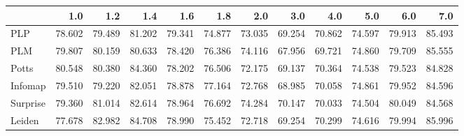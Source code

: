 \begin{tabular}{lrrrrrrrrrrr}
\toprule
{} &    1.0 &    1.2 &    1.4 &    1.6 &    1.8 &    2.0 &    3.0 &    4.0 &    5.0 &    6.0 &    7.0 \\
\midrule
PLP      & 78.602 & 79.489 & 81.202 & 79.341 & 74.877 & 73.035 & 69.254 & 70.862 & 74.597 & 79.913 & 85.493 \\
PLM      & 79.807 & 80.159 & 80.633 & 78.420 & 76.386 & 74.116 & 67.956 & 69.721 & 74.860 & 79.709 & 85.555 \\
Potts    & 80.548 & 80.380 & 84.360 & 78.202 & 76.506 & 72.175 & 69.137 & 70.364 & 74.538 & 79.523 & 84.828 \\
Infomap  & 79.510 & 79.220 & 82.051 & 78.878 & 77.164 & 72.768 & 68.985 & 70.058 & 74.861 & 79.952 & 84.596 \\
Surprise & 79.360 & 81.014 & 82.614 & 78.964 & 76.692 & 74.284 & 70.147 & 70.033 & 74.504 & 80.049 & 84.568 \\
Leiden   & 77.678 & 82.982 & 84.708 & 78.990 & 75.452 & 72.718 & 69.254 & 70.299 & 74.616 & 79.994 & 85.996 \\
\bottomrule
\end{tabular}
